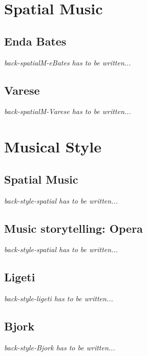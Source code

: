 \documentclass[letterpaper, openright]{report}
\begin{document}
    \section{Spatial Music} %
	\label{sub:back-spatialM}

			\subsection{Enda Bates} %
			\label{subsub:back-spatialM-eBates}
\textit{back-spatialM-eBates has to be written...}

			\subsection{Varese} %
			\label{subsub:back-spatialM-Varese}
\textit{back-spatialM-Varese has to be written...}
            

    \section{Musical Style} %
	\label{sub:back-style}
    
			\subsection{Spatial Music} %
			\label{subsub:back-style-spatialM}
\textit{back-style-spatial has to be written...}
            
            \subsection{Music storytelling: Opera} %
			\label{subsub:back-style-opera}
\textit{back-style-spatial has to be written...}
            
			\subsection{Ligeti} %
			\label{subsub:back-style-ligeti}
\textit{back-style-ligeti has to be written...}
 
			\subsection{Bjork} %
			\label{subsub:back-style-Bjork}
\textit{back-style-Bjork has to be written...}
 
\end{document}
